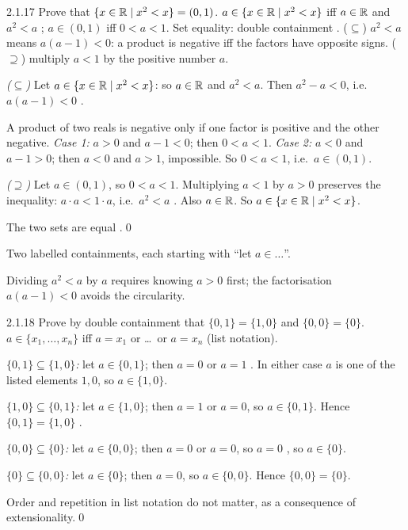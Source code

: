 \begin{bookex}[recommended]{2.1.17}
Prove that $\{x\in\mathbb{R}\mid x^2<x\}=(0,1)$.
\solution
\given $a\in\{x\in\mathbb{R}\mid x^2<x\}$ iff $a\in\mathbb{R}$ and $a^2<a$ ; $a\in(0,1)$ iff $0<a<1$.
\goal Set equality: double containment .
\plan ($\subseteq$) $a^2<a$ means $a(a-1)<0$: a product is negative iff the factors have opposite signs. ($\supseteq$) multiply $a<1$ by the positive number $a$.
\begin{steps}
\item \emph{($\subseteq$)} Let $a\in\{x\in\mathbb{R}\mid x^2<x\}$: so $a\in\mathbb{R}$ and $a^2<a$. Then $a^2-a<0$, i.e.\ $a(a-1)<0$ .
\item A product of two reals is negative only if one factor is positive and the other negative. \emph{Case 1:} $a>0$ and $a-1<0$; then $0<a<1$. \emph{Case 2:} $a<0$ and $a-1>0$; then $a<0$ and $a>1$, impossible. So $0<a<1$, i.e.\ $a\in(0,1)$.
\item \emph{($\supseteq$)} Let $a\in(0,1)$, so $0<a<1$. Multiplying $a<1$ by $a>0$ preserves the inequality: $a\cdot a<1\cdot a$, i.e.\ $a^2<a$ . Also $a\in\mathbb{R}$. So $a\in\{x\in\mathbb{R}\mid x^2<x\}$.
\end{steps}
\conclusion The two sets are equal .\qed
\begin{compare}
\item Two labelled containments, each starting with ``let $a\in\dots$''.
\item Dividing $a^2<a$ by $a$ requires knowing $a>0$ first; the factorisation $a(a-1)<0$ avoids the circularity.
\end{compare}
\end{bookex}

\begin{bookex}[recommended]{2.1.18}
Prove by double containment that $\{0,1\}=\{1,0\}$ and $\{0,0\}=\{0\}$.
\solution
\given $a\in\{x_1,\dots,x_n\}$ iff $a=x_1$ or \dots\ or $a=x_n$ (list notation).
\begin{steps}
\item \emph{$\{0,1\}\subseteq\{1,0\}$:} let $a\in\{0,1\}$; then $a=0$ or $a=1$ . In either case $a$ is one of the listed elements $1,0$, so $a\in\{1,0\}$.
\item \emph{$\{1,0\}\subseteq\{0,1\}$:} let $a\in\{1,0\}$; then $a=1$ or $a=0$, so $a\in\{0,1\}$. Hence $\{0,1\}=\{1,0\}$ .
\item \emph{$\{0,0\}\subseteq\{0\}$:} let $a\in\{0,0\}$; then $a=0$ or $a=0$, so $a=0$ , so $a\in\{0\}$.
\item \emph{$\{0\}\subseteq\{0,0\}$:} let $a\in\{0\}$; then $a=0$, so $a\in\{0,0\}$. Hence $\{0,0\}=\{0\}$.
\end{steps}
\conclusion Order and repetition in list notation do not matter, as a consequence of extensionality.\qed
\end{bookex}

